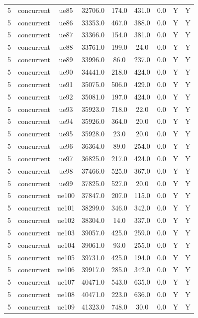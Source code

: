 \begin{table}[ht]
\begin{tabular}{|c|c|c|c|c|c|c|c|c|}
5 & concurrent & ue85 & 32706.0 & 174.0 & 431.0 & 0.0 & Y & Y \\
5 & concurrent & ue86 & 33353.0 & 467.0 & 388.0 & 0.0 & Y & Y \\
5 & concurrent & ue87 & 33366.0 & 154.0 & 381.0 & 0.0 & Y & Y \\
5 & concurrent & ue88 & 33761.0 & 199.0 & 24.0 & 0.0 & Y & Y \\
5 & concurrent & ue89 & 33996.0 & 86.0 & 237.0 & 0.0 & Y & Y \\
5 & concurrent & ue90 & 34441.0 & 218.0 & 424.0 & 0.0 & Y & Y \\
5 & concurrent & ue91 & 35075.0 & 506.0 & 429.0 & 0.0 & Y & Y \\
5 & concurrent & ue92 & 35081.0 & 197.0 & 424.0 & 0.0 & Y & Y \\
5 & concurrent & ue93 & 35923.0 & 718.0 & 22.0 & 0.0 & Y & Y \\
5 & concurrent & ue94 & 35926.0 & 364.0 & 20.0 & 0.0 & Y & Y \\
5 & concurrent & ue95 & 35928.0 & 23.0 & 20.0 & 0.0 & Y & Y \\
5 & concurrent & ue96 & 36364.0 & 89.0 & 254.0 & 0.0 & Y & Y \\
5 & concurrent & ue97 & 36825.0 & 217.0 & 424.0 & 0.0 & Y & Y \\
5 & concurrent & ue98 & 37466.0 & 525.0 & 367.0 & 0.0 & Y & Y \\
5 & concurrent & ue99 & 37825.0 & 527.0 & 20.0 & 0.0 & Y & Y \\
5 & concurrent & ue100 & 37847.0 & 207.0 & 115.0 & 0.0 & Y & Y \\
5 & concurrent & ue101 & 38299.0 & 346.0 & 342.0 & 0.0 & Y & Y \\
5 & concurrent & ue102 & 38304.0 & 14.0 & 337.0 & 0.0 & Y & Y \\
5 & concurrent & ue103 & 39057.0 & 425.0 & 259.0 & 0.0 & Y & Y \\
5 & concurrent & ue104 & 39061.0 & 93.0 & 255.0 & 0.0 & Y & Y \\
5 & concurrent & ue105 & 39731.0 & 425.0 & 194.0 & 0.0 & Y & Y \\
5 & concurrent & ue106 & 39917.0 & 285.0 & 342.0 & 0.0 & Y & Y \\
5 & concurrent & ue107 & 40471.0 & 543.0 & 635.0 & 0.0 & Y & Y \\
5 & concurrent & ue108 & 40471.0 & 223.0 & 636.0 & 0.0 & Y & Y \\
5 & concurrent & ue109 & 41323.0 & 748.0 & 30.0 & 0.0 & Y & Y \\

\end{tabular}
\end{table}

